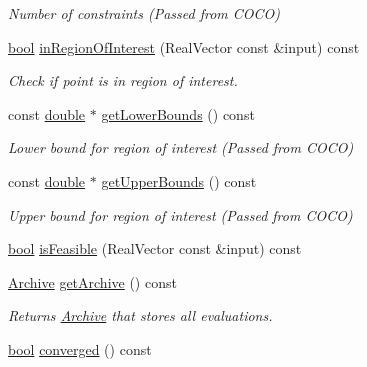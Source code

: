 \begin{DoxyCompactItemize}
\begin{DoxyCompactList}\small\item\em Number of constraints (Passed from C\+O\+CO) \end{DoxyCompactList}\item 
\hyperlink{classbool}{bool} \hyperlink{classCOCOfunc_ad6aa968a96ec542ff3696de2e982ea5d}{in\+Region\+Of\+Interest} (Real\+Vector const \&input) const 
\begin{DoxyCompactList}\small\item\em Check if point is in region of interest. \end{DoxyCompactList}\item 
const \hyperlink{classdouble}{double} $\ast$ \hyperlink{classCOCOfunc_a36c4660ffc4626348b94c0ddd6e79391}{get\+Lower\+Bounds} () const \hypertarget{classCOCOfunc_a36c4660ffc4626348b94c0ddd6e79391}{}\label{classCOCOfunc_a36c4660ffc4626348b94c0ddd6e79391}

\begin{DoxyCompactList}\small\item\em Lower bound for region of interest (Passed from C\+O\+CO) \end{DoxyCompactList}\item 
const \hyperlink{classdouble}{double} $\ast$ \hyperlink{classCOCOfunc_a04a3839722b0bd6ef34b7391d1c63101}{get\+Upper\+Bounds} () const \hypertarget{classCOCOfunc_a04a3839722b0bd6ef34b7391d1c63101}{}\label{classCOCOfunc_a04a3839722b0bd6ef34b7391d1c63101}

\begin{DoxyCompactList}\small\item\em Upper bound for region of interest (Passed from C\+O\+CO) \end{DoxyCompactList}\item 
\hyperlink{classbool}{bool} \hyperlink{classCOCOfunc_a81ffc0c8318e3f2163237f6329dfd621}{is\+Feasible} (Real\+Vector const \&input) const 
\item 
\hyperlink{classArchive}{Archive} \hyperlink{classCOCOfunc_aa0ed7f73c9689c5beceb67452494842e}{get\+Archive} () const \hypertarget{classCOCOfunc_aa0ed7f73c9689c5beceb67452494842e}{}\label{classCOCOfunc_aa0ed7f73c9689c5beceb67452494842e}

\begin{DoxyCompactList}\small\item\em Returns \hyperlink{classArchive}{Archive} that stores all evaluations. \end{DoxyCompactList}\item 
\hyperlink{classbool}{bool} \hyperlink{classCOCOfunc_a439fbb980cddaa9ffa900177f14c90e3}{converged} () const \hypertarget{classCOCOfunc_a439fbb980cddaa9ffa900177f14c90e3}{}\label{classCOCOfunc_a439fbb980cddaa9ffa900177f14c90e3}


\end{DoxyCompactItemize}
